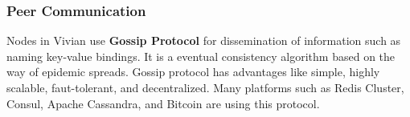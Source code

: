 \subsubsection{Peer Communication}

Nodes in Vivian use \textbf{Gossip Protocol} \cite{10.1145/41840.41841} for dissemination of information such as naming key-value bindings. It is a eventual consistency algorithm based on the way of epidemic spreads.
Gossip protocol has advantages like simple, highly scalable, faut-tolerant, and decentralized. Many platforms such as Redis Cluster, Consul, Apache Cassandra, and Bitcoin are using this protocol.